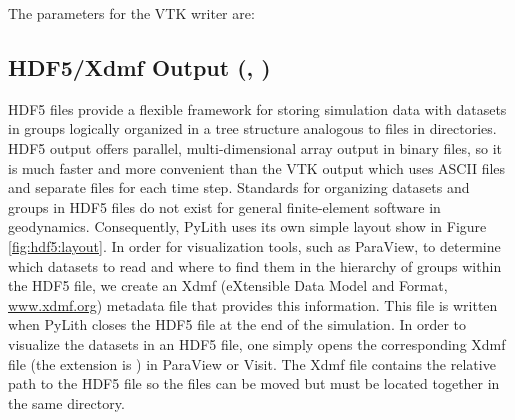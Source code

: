 The parameters for the VTK writer are:
\begin{inventory}
\end{inventory}

\subsection{HDF5/Xdmf Output (, )}
\label{sub:HDF5/Xdmf-Output}

HDF5 files provide a flexible framework for storing simulation data
with datasets in groups logically organized in a tree structure analogous
to files in directories. HDF5 output offers parallel, multi-dimensional
array output in binary files, so it is much faster and more convenient
than the VTK output which uses ASCII files and separate files for
each time step. Standards for organizing datasets and groups in HDF5
files do not exist for general finite-element software in geodynamics.
Consequently, PyLith uses its own simple layout show in Figure \vref{fig:hdf5:layout}.
In order for visualization tools, such as ParaView, to determine which
datasets to read and where to find them in the hierarchy of groups
within the HDF5 file, we create an Xdmf (eXtensible Data Model and
Format, \url{www.xdmf.org}) metadata file that provides this information.
This file is written when PyLith closes the HDF5 file at the end of
the simulation. In order to visualize the datasets in an HDF5 file,
one simply opens the corresponding Xdmf file (the extension is )
in ParaView or Visit. The Xdmf file contains the relative path to
the HDF5 file so the files can be moved but must be located together
in the same directory. 


